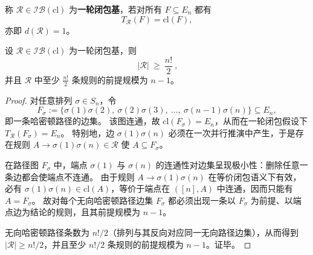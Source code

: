 \begin{definition}[一轮闭包基]\label{def:pom-one-round-closure-basis}
称 \(\mathcal{R}\in\mathcal{IB}(\mathrm{cl})\) 为\textbf{一轮闭包基}，若对所有 \(F\subseteq E_n\) 都有
\[
T_{\mathcal{R}}(F)=\mathrm{cl}(F),
\]
亦即 \(d(\mathcal{R})=1\)。
\end{definition}

\begin{theorem}[一轮闭包的规则数下界]\label{thm:pom-one-round-closure-basis-size}
设 \(\mathcal{R}\in\mathcal{IB}(\mathrm{cl})\) 为一轮闭包基，则
\[
\boxed{\ |\mathcal{R}|\ \ge\ \frac{n!}{2}\ },
\]
并且 \(\mathcal{R}\) 中至少 \(\frac{n!}{2}\) 条规则的前提规模为 \(n-1\)。
\end{theorem}
\begin{proof}
对任意排列 \(\sigma\in S_n\)，令
\[
F_\sigma:=\{\sigma(1)\sigma(2),\ \sigma(2)\sigma(3),\ \dots,\ \sigma(n-1)\sigma(n)\}\subseteq E_n,
\]
即一条哈密顿路径的边集。
该图连通，故 \(\mathrm{cl}(F_\sigma)=E_n\)，从而在一轮闭包假设下 \(T_{\mathcal{R}}(F_\sigma)=E_n\)。
特别地，边 \(\sigma(1)\sigma(n)\) 必须在一次并行推演中产生，于是存在规则 \(A\to \sigma(1)\sigma(n)\in\mathcal{R}\) 使 \(A\subseteq F_\sigma\)。
\par
在路径图 \(F_\sigma\) 中，端点 \(\sigma(1)\) 与 \(\sigma(n)\) 的连通性对边集呈现极小性：删除任意一条边都会使端点不连通。
由于规则 \(A\to \sigma(1)\sigma(n)\) 在等价闭包语义下有效，必有 \(\sigma(1)\sigma(n)\in \mathrm{cl}(A)\)，等价于端点在 \(([n],A)\) 中连通，因而只能有 \(A=F_\sigma\)。
故对每个无向哈密顿路径边集 \(F_\sigma\) 都必须出现一条以 \(F_\sigma\) 为前提、以端点边为结论的规则，且其前提规模为 \(n-1\)。
\par
无向哈密顿路径条数为 \(n!/2\)（排列与其反向对应同一无向路径边集），从而得到 \(|\mathcal{R}|\ge n!/2\)，并且至少 \(n!/2\) 条规则的前提规模为 \(n-1\)。证毕。
\end{proof}

